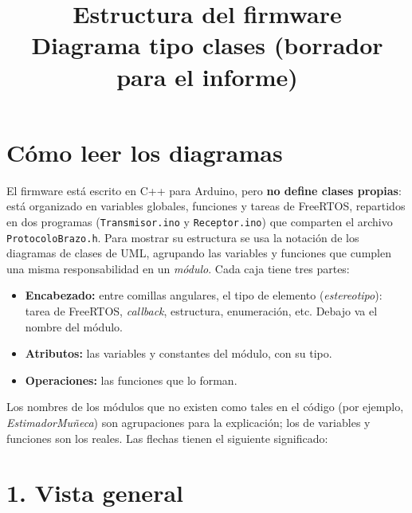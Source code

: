 \documentclass[11pt,a4paper]{article}
\title{Estructura del firmware\\\large Diagrama tipo clases (borrador para el informe)}
\date{}
\begin{document}
\maketitle

\section*{Cómo leer los diagramas}

El firmware está escrito en C++ para Arduino, pero \textbf{no define clases propias}: está organizado en variables globales, funciones y tareas de FreeRTOS, repartidos en dos programas (\texttt{Transmisor.ino} y \texttt{Receptor.ino}) que comparten el archivo \texttt{ProtocoloBrazo.h}. Para mostrar su estructura se usa la notación de los diagramas de clases de UML, agrupando las variables y funciones que cumplen una misma responsabilidad en un \emph{módulo}. Cada caja tiene tres partes:

\begin{itemize}
  \item \textbf{Encabezado:} entre comillas angulares, el tipo de elemento (\emph{estereotipo}): tarea de FreeRTOS, \emph{callback}, estructura, enumeración, etc. Debajo va el nombre del módulo.
  \item \textbf{Atributos:} las variables y constantes del módulo, con su tipo.
  \item \textbf{Operaciones:} las funciones que lo forman.
\end{itemize}

Los nombres de los módulos que no existen como tales en el código (por ejemplo, \emph{EstimadorMuñeca}) son agrupaciones para la explicación; los de variables y funciones son los reales. Las flechas tienen el siguiente significado:

\begin{center}
\end{center}

\section*{1. Vista general}
\end{document}
